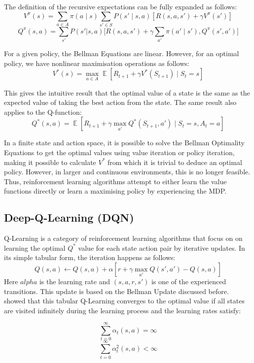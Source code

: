 \documentclass[12pt,a4paper]{report}
\DeclareMathOperator{\EX}{\mathbb{E}}
\begin{document}
The definition of the recursive expectations can be fully expanded as follows:
\[
V^{\pi}(s) = \sum_{a \in A} \pi(a \mid s) \sum_{s' \in S} P(s' \mid s, a) \left[ R(s, a, s') + \gamma V^{\pi}(s') \right]
\]
\[
Q^\pi(s,a) = \sum_{s'}P(s'|s,a)\big[ R(s,a,s') + \gamma \sum_{a'}\pi(a'\mid s'),Q^\pi(s',a')\big]
\] \par

For a given policy, the Bellman Equations are linear. However, for an optimal policy, we have nonlinear maximisation operations as follows: 
\[
  V^*(s) = \max_{a \in A}\EX[ R_{t+1} + \gamma V^*(S_{t+1}) \mid S_{t}= s]
\] \par

This gives the intuitive result that the optimal value of a state is the same as the expected value of taking the best action from the state. The same result also applies to the Q-function:
\[
Q^*(s, a) = \EX [ R_{t+1} + \gamma \max_{a'} Q^*(S_{t+1}, a') \mid S_t = s, A_t = a ]
\] \par

In a finite state and action space, it is possible to solve the Bellman Optimality Equations to get the optimal values using value iteration or policy iteration, making it possible to calculate $V^*$ from which it is trivial to deduce an optimal policy. However, in larger and continuous environments, this is no longer feasible. Thus, reinforcement learning algorithms attempt to either learn the value functions directly or learn a maximising policy by experiencing the MDP. \par

\subsection{Deep-Q-Learning (DQN)}

Q-Learning is a category of reinforcement learning algorithms that focus on on learning the optimal $Q^*$ value for each state action pair by iterative updates. In its simple tabular form, the iteration happens as follows:
\[Q(s, a) \leftarrow Q(s, a) + \alpha [ r + \gamma \max_{a'} Q(s', a') - Q(s, a) ]\]
Here $alpha$ is the learning rate and $(s,a,r,s')$ is one of the experienced transitions. This update is based on the Bellman Update discussed before. \cite{Watkins1992} showed that this tabular Q-Learning converges to the optimal value if all states are visited infinitely during the learning process and the learning rates satisfy: 

\[
\sum_{t=0}^{\infty} \alpha_t(s, a) = \infty
\]
\[
\sum_{t=0}^{\infty} \alpha_t^2(s, a) < \infty
\]
\end{document}
